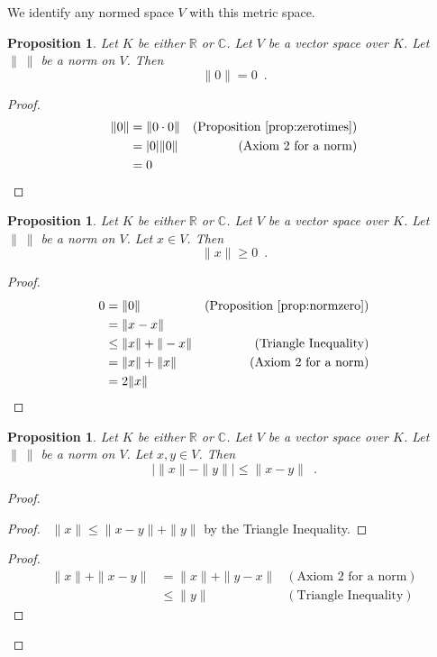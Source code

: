 \documentclass{book}
\let\qed\relax
\newtheorem{prop}[ax]{Proposition}
\theoremstyle{definition}
\begin{document}
We identify any normed space $V$ with this metric space.

\begin{prop}
\label{prop:normzero}
Let $K$ be either $\mathbb{R}$ or $\mathbb{C}$. Let $V$ be a vector space over $K$. Let $\|\ \|$ be a norm on $V$. Then
\[ \| 0 \| = 0 \enspace . \]
\end{prop}

\begin{proof}
\pf
\begin{align*}
\| 0 \| & = \| 0 \cdot 0 \| & (\text{Proposition \ref{prop:zerotimes}}) \\
& = |0| \| 0 \| & (\text{Axiom 2 for a norm}) \\
& = 0 & \qed
\end{align*}
\end{proof}

\begin{prop}
Let $K$ be either $\mathbb{R}$ or $\mathbb{C}$. Let $V$ be a vector space over $K$. Let $\|\ \|$ be a norm on $V$. Let $x \in V$. Then
\[ \| x \| \geq 0 \enspace . \]
\end{prop}

\begin{proof}
\pf
\begin{align*}
0 & = \| 0 \| &  (\text{Proposition \ref{prop:normzero}}) \\
& = \| x - x \| \\
& \leq \| x \| + \| - x \| & (\text{Triangle Inequality}) \\
& = \| x \| + \| x \| & (\text{Axiom 2 for a norm}) \\
& = 2 \| x\| & \qed
\end{align*}
\end{proof}

\begin{prop}
\label{prop:distancebetweennorms}
Let $K$ be either $\mathbb{R}$ or $\mathbb{C}$. Let $V$ be a vector space over $K$. Let $\|\ \|$ be a norm on $V$. Let $x,y \in V$. Then
\[ | \| x \| - \| y \| | \leq \| x - y \| \enspace . \]
\end{prop}

\begin{proof}
\pf
{}
\begin{proof}
	\pf\ $\|x\| \leq \| x - y \| + \|y \|$ by the Triangle Inequality.
\end{proof}
\begin{proof}
	\pf
	\begin{align*}
		\| x \| + \| x - y \| & = \| x \| + \| y - x\| & (\text{Axiom 2 for a norm}) \\
		& \leq \| y \| & (\text{Triangle Inequality})
	\end{align*}
\end{proof}
\qed
\end{proof}
\end{document}
